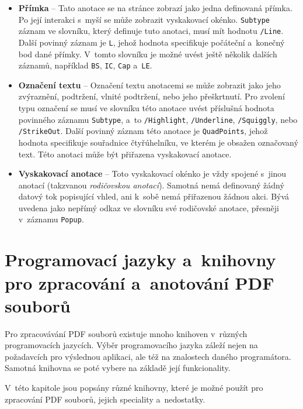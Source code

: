 \begin{itemize}
    \item \textbf{Přímka} -- Tato anotace se na stránce zobrazí
    jako jedna definovaná přímka. Po její interakci s~myší se
    může zobrazit vyskakovací okénko. \texttt{Subtype} záznam ve slovníku, který
    definuje tuto anotaci, musí mít hodnotu \texttt{/Line}. Další
    povinný záznam je \texttt{L}, jehož hodnota specifikuje počáteční 
    a~konečný bod dané přímky. V~tomto slovníku je možné uvést
    ještě několik dalších záznamů, například \texttt{BS}, \texttt{IC},
    \texttt{Cap} a~\texttt{LE}.
    
    \item \textbf{Označení textu} -- Označení textu anotacemi se může zobrazit
    jako jeho zvýraznění, podtržení, vlnité podtržení, nebo jeho přeškrtnutí.
    Pro zvolení typu označení se musí ve slovníku této anotace uvést příslušná
    hodnota povinného záznamu \texttt{Subtype}, a~to \texttt{/Highlight},
    \texttt{/Underline}, \texttt{/Squiggly}, nebo \texttt{/StrikeOut}.
    Další povinný záznam této anotace je \texttt{QuadPoints}, jehož hodnota
    specifikuje souřadnice čtyřúhelníku, ve kterém je obsažen označovaný text.
    Této anotaci může být přiřazena vyskakovací anotace.
    
    \item \textbf{Vyskakovací anotace} -- Toto vyskakovací okénko je vždy spojené
    s~jinou anotací (takzvanou \emph{rodičovskou anotací}). Samotná nemá
    definovaný žádný datový tok popisující vhled, ani k~sobě nemá přiřazenou
    žádnou akci. Bývá uvedena jako nepřímý odkaz ve slovníku své rodičovské
    anotace, přesněji v~záznamu \texttt{Popup}.
\end{itemize}

\DummyText



\section{Programovací jazyky a~knihovny pro zpracování a~anotování PDF souborů}

Pro zpracovávání PDF souborů existuje mnoho knihoven v~různých programovacích
jazycích. Výběr programovacího jazyka záleží nejen na požadavcích pro výslednou
aplikaci, ale též na znalostech daného programátora. Samotná knihovna se poté
vybere na základě její funkcionality. 

V~této kapitole jsou popsány různé knihovny, které je možné použít pro zpracování
PDF souborů, jejich speciality a~nedostatky.


